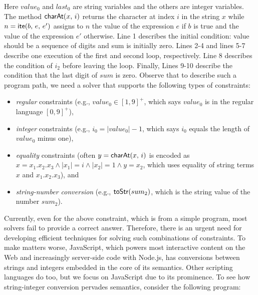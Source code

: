 \documentclass[sigplan,review,anonymous]{acmart}\settopmatter{printfolios=true,printccs=false,printacmref=false}
\begin{document}
Here $value_0$ and $last_0$ are string variables and the others are integer variables. The method $\mbox{\textsf{charAt}($x$, $i$)}$ returns the character at index $i$ in the string $x$ while $n=\mbox{\textsf{ite}($b$, $e$, $e'$)}$ assigns to $n$ the value of the expression $e$ if $b$ is true and the value of the expression $e'$ otherwise. Line 1 describes the initial condition: \textsf{value} should be a sequence of digits and \textsf{sum} is initially zero. Lines 2-4 and lines 5-7 describe one execution of the first and second loop, respectively. Line 8 describes the condition of $i_2$ before leaving the loop. Finally, Lines 9-10 describe the condition that the last digit of $sum$ is zero. Observe that to describe such a program path, we need a solver that supports the following types of constraints:
\begin{itemize}
	\item \emph{regular} constraints (e.g., $value_0 \in [1,9]^+$, which says $value_0$ is in the regular language $[0,9]^+$),
	\item \emph{integer} constraints (e.g., $i_0 = |value_0| -1$, which says $i_0$ equals the length of $value_0$ minus one),
	\item \emph{equality} constraints (often $y=\mbox{\textsf{charAt}($x$, $i$)}$ is encoded as $x=x_1.x_2.x_3 \wedge |x_1| = i \wedge |x_2| =1 \wedge y= x_2$, which uses equality of string terms $x$ and $x_1.x_2.x_3$), and
	\item \emph{string-number conversion} (e.g., $\mbox{\textsf{toStr}($sum_2$)}$, which is the string value of the number $sum_2$).
\end{itemize}

Currently, even for the above constraint, which is from a simple program, most solvers fail to provide a correct answer. Therefore, there is an urgent need for developing efficient techniques for solving such combinations of constraints. To make matters worse, JavaScript, which powers most interactive content on the Web and increasingly server-side code with Node.js, has conversions between strings and integers embedded in the core of its semantics. Other scripting languages do too, but we focus on JavaScript due to its prominence. To see how string-integer conversion pervades semantics, consider the following program:


\end{document}
